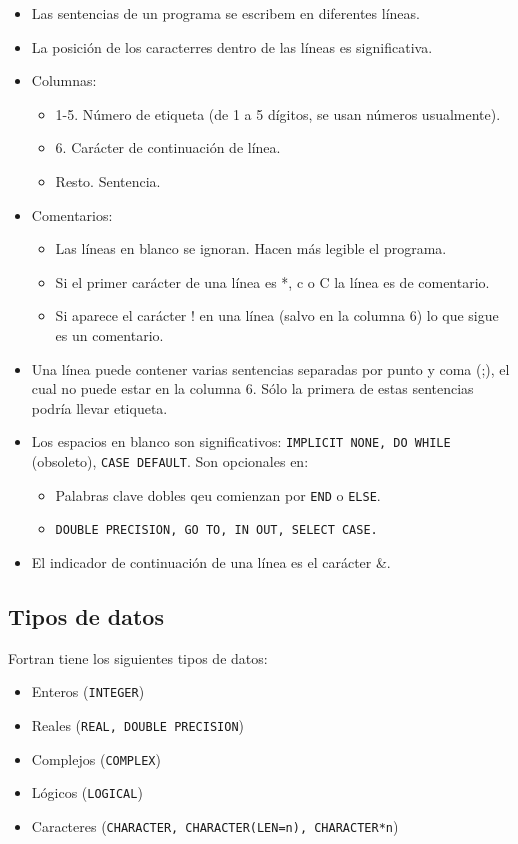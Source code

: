 \begin{itemize}
	\item Las sentencias de un programa se escribem en diferentes líneas.
	\item La posición de los caracterres dentro de las líneas es significativa.
	\item Columnas:
	      \begin{itemize}
		      \item 1-5. Número de etiqueta (de 1 a 5 dígitos, se usan números usualmente).
		      \item 6. Carácter de continuación de línea.
		      \item Resto. Sentencia.
	      \end{itemize}
	\item Comentarios:
	      \begin{itemize}
		      \item Las líneas en blanco se ignoran. Hacen más legible el programa.
		      \item Si el primer carácter de una línea es *, c o C la línea es de comentario.
		      \item Si aparece el carácter ! en una línea (salvo en la columna 6) lo que sigue es un comentario.
	      \end{itemize}
	\item Una línea puede contener varias sentencias separadas por punto y coma (;), el cual no puede estar en la columna 6. Sólo la primera de estas sentencias podría llevar etiqueta.
	\item Los espacios en blanco son significativos: {\tt IMPLICIT NONE, DO WHILE} (obsoleto), {\tt CASE DEFAULT}. Son opcionales en:
	      \begin{itemize}
		      \item Palabras clave dobles qeu comienzan por {\tt END} o {\tt ELSE}.
		      \item {\tt DOUBLE PRECISION, GO TO, IN OUT, SELECT CASE.}
	      \end{itemize}
	\item  El indicador de continuación de una línea es el carácter \&.
\end{itemize}

\subsection{Tipos de datos}

Fortran tiene los siguientes tipos de datos:

\begin{itemize}
	\item Enteros ({\tt INTEGER})
	\item Reales ({\tt REAL, DOUBLE PRECISION})
	\item Complejos ({\tt COMPLEX})
	\item Lógicos ({\tt LOGICAL})
	\item Caracteres ({\tt CHARACTER, CHARACTER(LEN=n), CHARACTER*n})
\end{itemize}

